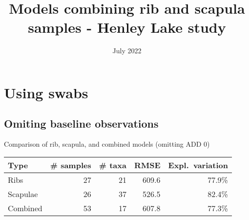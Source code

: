 \documentclass{beamer}
\title[]{Models combining rib and scapula samples - Henley Lake study}
\date{July 2022}
\begin{document}
\begin{frame}
   \titlepage
\end{frame}












\section{Using swabs}


\subsection{Omiting baseline observations}

\begin{frame}{Comparison of rib, scapula, and combined models (omitting ADD 0)}

  \begin{tabular}{lrrrr}
    Type & \# samples & \# taxa & RMSE & Expl.\ variation\\ \hline
    Ribs & 27 & 21 & 609.6 & 77.9\% \\
    Scapulae & 26 & 37 & 526.5 & 82.4\% \\
    Combined & 53 & 17 & 607.8 & 77.3\%
  \end{tabular}
  
  \vspace{0.1in}

\end{frame}


\end{document}

